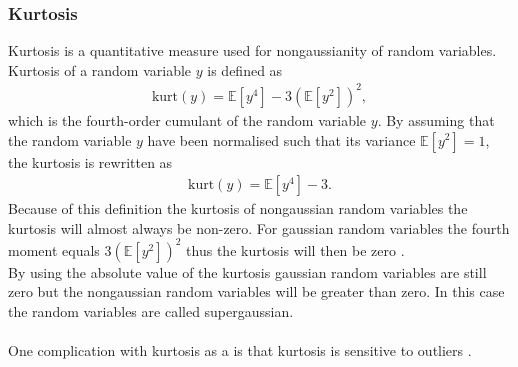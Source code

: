 \subsubsection{Kurtosis}
Kurtosis is a quantitative measure used for nongaussianity of random variables. Kurtosis of a random variable $y$ is defined as
\begin{align*}
\text{kurt} (y) = \mathbb{E}[y^4] - 3 ( \mathbb{E}[y^2])^2,
\end{align*}
which is the fourth-order cumulant of the random variable $y$. By assuming that the random variable $y$ have been normalised such that its variance $\mathbb{E}[y^2] = 1$, the kurtosis is rewritten as
\begin{align*}
\text{kurt} (y) = \mathbb{E}[y^4] - 3.
\end{align*}
Because of this definition the kurtosis of nongaussian random variables the kurtosis will almost always be non-zero. For gaussian random variables the fourth moment equals $3(\mathbb{E}[y^2])^2$ thus the kurtosis will then be zero \cite[p. 171]{ICA}.
\\
By using the absolute value of the kurtosis gaussian random variables are still zero but the nongaussian random variables will be greater than zero. In this case the random variables are called supergaussian.
\\ \\
One complication with kurtosis as a is that kurtosis is sensitive to outliers \cite[p. 182]{ICA}.
 
